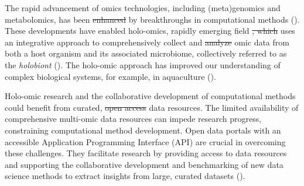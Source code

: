 \documentclass[unnumsec,webpdf,namedate,modern,large]{oup-authoring-template}%
\providecommand{\DIFaddtex}[1]{{\protect\color{blue}\uwave{#1}}} %
\providecommand{\DIFdeltex}[1]{{\protect\color{red}\sout{#1}}}                      %
\providecommand{\DIFaddbegin}{} %
\providecommand{\DIFaddend}{} %
\providecommand{\DIFdelbegin}{} %
\providecommand{\DIFdelend}{} %
\providecommand{\DIFadd}[1]{\texorpdfstring{\DIFaddtex{#1}}{#1}} %
\providecommand{\DIFdel}[1]{\texorpdfstring{\DIFdeltex{#1}}{}} %
\newcommand{\DIFscaledelfig}{0.5}
\newlength{\DIFdelgraphicswidth} %
\newlength{\DIFdelgraphicsheight} %
\newcommand{\DIFaddincludegraphics}[2][]{{\color{blue}\fbox{\DIFOincludegraphics[#1]{#2}}}} %
\newcommand{\DIFdelincludegraphics}[2][]{%
\sbox{\DIFdelgraphicsbox}{\DIFOincludegraphics[#1]{#2}}%
\settoboxwidth{\DIFdelgraphicswidth}{\DIFdelgraphicsbox} %
\settoboxtotalheight{\DIFdelgraphicsheight}{\DIFdelgraphicsbox} %
\scalebox{\DIFscaledelfig}{%
\parbox[b]{\DIFdelgraphicswidth}{\usebox{\DIFdelgraphicsbox}\\[-\baselineskip] \rule{\DIFdelgraphicswidth}{0em}}\llap{\resizebox{\DIFdelgraphicswidth}{\DIFdelgraphicsheight}{%
\setlength{\unitlength}{\DIFdelgraphicswidth}%
\begin{picture}(1,1)%
\thicklines\linethickness{2pt} %
{\color[rgb]{1,0,0}\put(0,0){\framebox(1,1){}}}%
{\color[rgb]{1,0,0}\put(0,0){\line( 1,1){1}}}%
{\color[rgb]{1,0,0}\put(0,1){\line(1,-1){1}}}%
\end{picture}%
}\hspace*{3pt}}} %
} %
\DeclareRobustCommand{\DIFaddbegin}{\DIFOaddbegin \let\includegraphics\DIFaddincludegraphics} %
\DeclareRobustCommand{\DIFaddend}{\DIFOaddend \let\includegraphics\DIFOincludegraphics} %
\DeclareRobustCommand{\DIFdelbegin}{\DIFOdelbegin \let\includegraphics\DIFdelincludegraphics} %
\DeclareRobustCommand{\DIFdelend}{\DIFOaddend \let\includegraphics\DIFOincludegraphics} %
\begin{document}
The rapid advancement of omics technologies, including (meta)genomics and metabolomics, has been \DIFdelbegin \DIFdel{enhanced }\DIFdelend \DIFaddbegin \DIFadd{driven }\DIFaddend by breakthroughs in computational methods (\cite{moreno-indias_statistical_2021,marcos-zambrano_toolbox_2023,santamaria_bioinformatic_2024}).
These developments have enabled holo-omics, \DIFaddbegin \DIFadd{a }\DIFaddend rapidly emerging field \DIFdelbegin \DIFdel{, which }\DIFdelend \DIFaddbegin \DIFadd{that }\DIFaddend uses an integrative approach to comprehensively collect and \DIFdelbegin \DIFdel{analyze }\DIFdelend \DIFaddbegin \DIFadd{analyse }\DIFaddend omic data from both a host organism and its associated microbiome, collectively referred to as the {\it holobiont} (\cite{nyholmHoloOmicsIntegratedHostMicrobiota2020,limborgAppliedHologenomicsFeasibility2018,odriozola_practical_2024}). The holo-omic approach has improved our understanding of complex biological systems, for example, in aquaculture (\cite{limborgAppliedHologenomicsFeasibility2018,atlantic_salmon}).

\DIFdelbegin %


\DIFdelend Holo-omic research and the collaborative development of computational methods could benefit from curated, \DIFdelbegin \DIFdel{open access }\DIFdelend \DIFaddbegin \DIFadd{open-access }\DIFaddend data resources.
The limited availability of comprehensive multi-omic data resources can impede research progress, constraining computational method development. Open data portals with an accessible Application Programming Interface (API) are crucial in overcoming these challenges. They facilitate research by providing access to data resources and supporting the collaborative development and benchmarking of new data science methods to extract insights from large, curated datasets (\cite{pasolli_2017}).
\end{document}
